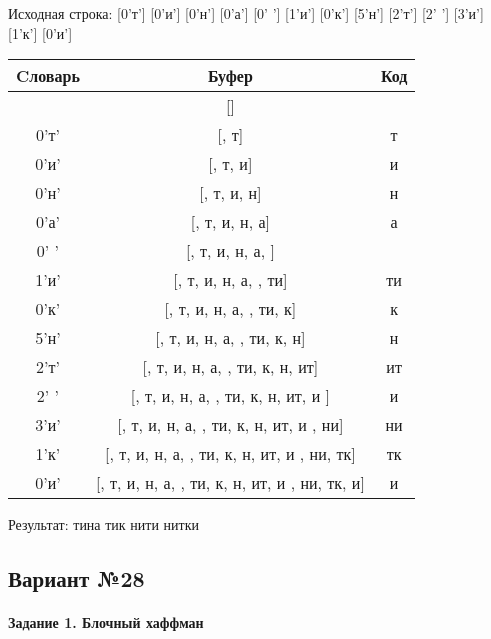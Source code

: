 \documentclass[a4paper, 12pt]{article}
\begin{document}
Исходная строка: [0'т'] [0'и'] [0'н'] [0'а'] [0' '] [1'и'] [0'к'] [5'н'] [2'т'] [2' '] [3'и'] [1'к'] [0'и']\\
\begin{table}[h!]
\centering
\begin{tabular}{|c|c|c|}
\hline
 Cловарь & Буфер & Код  \\ \hline
 & [] & 
\\ \hline
0'т' & [, т] & т
\\ \hline
0'и' & [, т, и] & и
\\ \hline
0'н' & [, т, и, н] & н
\\ \hline
0'а' & [, т, и, н, а] & а
\\ \hline
0' ' & [, т, и, н, а,  ] &  
\\ \hline
1'и' & [, т, и, н, а,  , ти] & ти
\\ \hline
0'к' & [, т, и, н, а,  , ти, к] & к
\\ \hline
5'н' & [, т, и, н, а,  , ти, к,  н] &  н
\\ \hline
2'т' & [, т, и, н, а,  , ти, к,  н, ит] & ит
\\ \hline
2' ' & [, т, и, н, а,  , ти, к,  н, ит, и ] & и 
\\ \hline
3'и' & [, т, и, н, а,  , ти, к,  н, ит, и , ни] & ни
\\ \hline
1'к' & [, т, и, н, а,  , ти, к,  н, ит, и , ни, тк] & тк
\\ \hline
0'и' & [, т, и, н, а,  , ти, к,  н, ит, и , ни, тк, и] & и
\\ \hline
\end{tabular}
\end{table}

Результат: тина тик нити нитки
\pagebreak
\subsection{Вариант №28}
\paragraph{Задание 1. Блочный хаффман \\}
\end{document}
